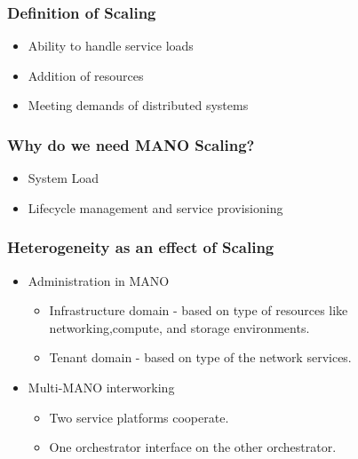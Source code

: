 \begin{frame}
\frametitle{Definition of Scaling}
\begin{itemize}
	
	\item Ability to handle service loads
	
	\item Addition of resources
	
	
	\item Meeting demands of distributed systems
	
\end{itemize}
\end{frame}


\begin{frame}
\frametitle{Why do we need MANO Scaling?}

\begin{itemize}
	\item System Load
	\item Lifecycle management and service provisioning
	
\end{itemize}   
\end{frame}

\begin{frame}
\frametitle{Heterogeneity as an effect of Scaling}
\begin{itemize}
	\item Administration in MANO
	\begin{itemize}
		\item Infrastructure domain - based on type of resources like networking,compute, and storage environments.
		
		\item Tenant domain - based on type of the network services.
	\end{itemize}
	\item Multi-MANO interworking
	\begin{itemize}
		\item Two service platforms cooperate.
		\item One orchestrator interface on the other orchestrator.
	\end{itemize}
	
	
\end{itemize}
\end{frame}



